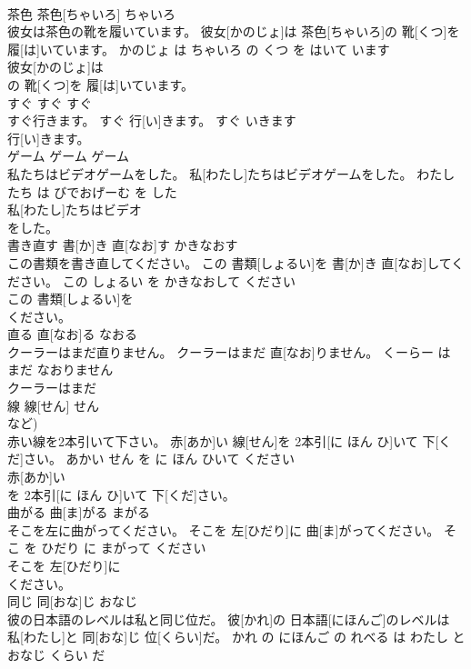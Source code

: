 \documentclass[8pt]{extreport}
\begin{document}
\begin{CJK}{UTF8}{min}
\\	茶色	茶色[ちゃいろ]	ちゃいろ	
\\	彼女は茶色の靴を履いています。	彼女[かのじょ]は 茶色[ちゃいろ]の 靴[くつ]を 履[は]いています。	かのじょ は ちゃいろ の くつ を はいて います	
\\	彼女[かのじょ]は
\\	の 靴[くつ]を 履[は]いています。		
\\	すぐ	すぐ	すぐ	
\\	すぐ行きます。	すぐ 行[い]きます。	すぐ いきます	
\\	行[い]きます。		
\\	ゲーム	ゲーム	ゲーム	
\\	私たちはビデオゲームをした。	私[わたし]たちはビデオゲームをした。	わたしたち は びでおげーむ を した	
\\	私[わたし]たちはビデオ
\\	をした。		
\\	書き直す	書[か]き 直[なお]す	かきなおす	
\\	この書類を書き直してください。	この 書類[しょるい]を 書[か]き 直[なお]してください。	この しょるい を かきなおして ください	
\\	この 書類[しょるい]を
\\	ください。		
\\	直る	直[なお]る	なおる	
\\	クーラーはまだ直りません。	クーラーはまだ 直[なお]りません。	くーらー は まだ なおりません	
\\	クーラーはまだ
\\	線	線[せん]	せん	
\\	など)		
\\	赤い線を2本引いて下さい。	赤[あか]い 線[せん]を 2本引[に ほん ひ]いて 下[くだ]さい。	あかい せん を に ほん ひいて ください	
\\	赤[あか]い
\\	を 2本引[に ほん ひ]いて 下[くだ]さい。		
\\	曲がる	曲[ま]がる	まがる	
\\	そこを左に曲がってください。	そこを 左[ひだり]に 曲[ま]がってください。	そこ を ひだり に まがって ください	
\\	そこを 左[ひだり]に
\\	ください。		
\\	同じ	同[おな]じ	おなじ	
\\	彼の日本語のレベルは私と同じ位だ。	彼[かれ]の 日本語[にほんご]のレベルは 私[わたし]と 同[おな]じ 位[くらい]だ。	かれ の にほんご の れべる は わたし と おなじ くらい だ	

\end{CJK}
\end{document}
